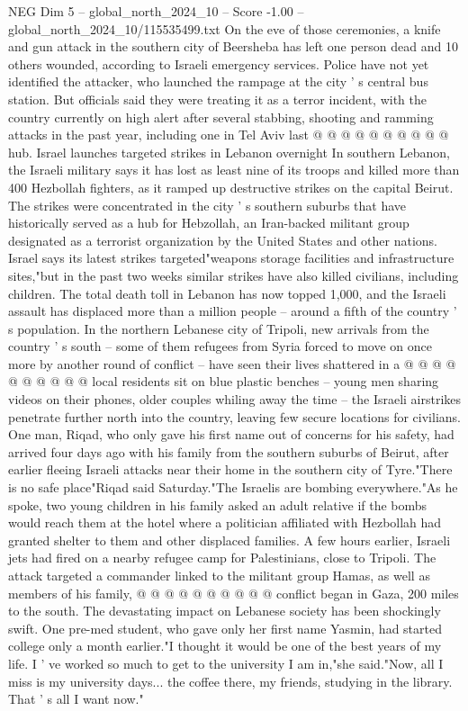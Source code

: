 \begin{textsample}{NEG Dim 5 – global\_north\_2024\_10 – Score -1.00 – global\_north\_2024\_10/115535499.txt}
On the eve of those ceremonies, a knife and gun attack in the southern city of Beersheba has left one person dead and 10 others wounded, according to Israeli emergency services.
Police have not yet identified the attacker, who launched the rampage at the city ' s central bus station.
But officials said they were treating it as a terror incident, with the country currently on high alert after several stabbing, shooting and ramming attacks in the past year, including one in Tel Aviv last @ @ @ @ @ @ @ @ @ @ hub.
Israel launches targeted strikes in Lebanon overnight In southern Lebanon, the Israeli military says it has lost as least nine of its troops and killed more than 400 Hezbollah fighters, as it ramped up destructive strikes on the capital Beirut.
The strikes were concentrated in the city ' s southern suburbs that have historically served as a hub for Hebzollah, an Iran-backed militant group designated as a terrorist organization by the United States and other nations.
Israel says its latest strikes targeted"weapons storage facilities and infrastructure sites,"but in the past two weeks similar strikes have also killed civilians, including children.
The total death toll in Lebanon has now topped 1,000, and the Israeli assault has displaced more than a million people -- around a fifth of the country ' s population.
In the northern Lebanese city of Tripoli, new arrivals from the country ' s south -- some of them refugees from Syria forced to move on once more by another round of conflict -- have seen their lives shattered in a @ @ @ @ @ @ @ @ @ @ local residents sit on blue plastic benches -- young men sharing videos on their phones, older couples whiling away the time -- the Israeli airstrikes penetrate further north into the country, leaving few secure locations for civilians.
One man, Riqad, who only gave his first name out of concerns for his safety, had arrived four days ago with his family from the southern suburbs of Beirut, after earlier fleeing Israeli attacks near their home in the southern city of Tyre."There is no safe place"Riqad said Saturday."The Israelis are bombing everywhere."As he spoke, two young children in his family asked an adult relative if the bombs would reach them at the hotel where a politician affiliated with Hezbollah had granted shelter to them and other displaced families.
A few hours earlier, Israeli jets had fired on a nearby refugee camp for Palestinians, close to Tripoli.
The attack targeted a commander linked to the militant group Hamas, as well as members of his family, @ @ @ @ @ @ @ @ @ @ conflict began in Gaza, 200 miles to the south.
The devastating impact on Lebanese society has been shockingly swift.
One pre-med student, who gave only her first name Yasmin, had started college only a month earlier."I thought it would be one of the best years of my life.
I ' ve worked so much to get to the university I am in,"she said."Now, all I miss is my university days... the coffee there, my friends, studying in the library.
That ' s all I want now."

\end{textsample}
